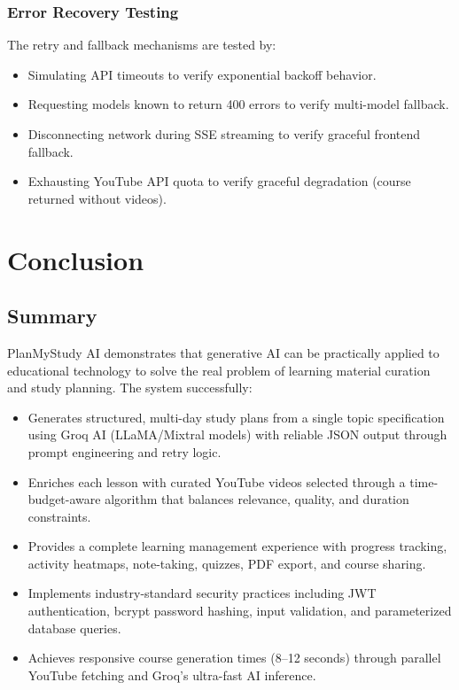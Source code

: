 \documentclass[12pt,a4paper]{report}
\begin{document}
\subsection{Error Recovery Testing}
The retry and fallback mechanisms are tested by:
\begin{itemize}[noitemsep]
    \item Simulating API timeouts to verify exponential backoff behavior.
    \item Requesting models known to return 400 errors to verify multi-model fallback.
    \item Disconnecting network during SSE streaming to verify graceful frontend fallback.
    \item Exhausting YouTube API quota to verify graceful degradation (course returned without videos).
\end{itemize}


\chapter{Conclusion}

\section{Summary}
PlanMyStudy AI demonstrates that generative AI can be practically applied to educational technology to solve the real problem of learning material curation and study planning. The system successfully:

\begin{itemize}[noitemsep]
    \item Generates structured, multi-day study plans from a single topic specification using Groq AI (LLaMA/Mixtral models) with reliable JSON output through prompt engineering and retry logic.
    \item Enriches each lesson with curated YouTube videos selected through a time-budget-aware algorithm that balances relevance, quality, and duration constraints.
    \item Provides a complete learning management experience with progress tracking, activity heatmaps, note-taking, quizzes, PDF export, and course sharing.
    \item Implements industry-standard security practices including JWT authentication, bcrypt password hashing, input validation, and parameterized database queries.
    \item Achieves responsive course generation times (8--12 seconds) through parallel YouTube fetching and Groq's ultra-fast AI inference.
\end{itemize}
\end{document}
